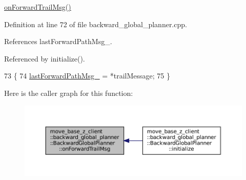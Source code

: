 \hyperlink{classmove__base__z__client_1_1backward__global__planner_1_1BackwardGlobalPlanner_a21ba5e6dbe063eb3ea1a34d8cccf90a3}{on\+Forward\+Trail\+Msg()} 

Definition at line 72 of file backward\+\_\+global\+\_\+planner.\+cpp.



References last\+Forward\+Path\+Msg\+\_\+.



Referenced by initialize().


\begin{DoxyCode}
73 \{
74     \hyperlink{classmove__base__z__client_1_1backward__global__planner_1_1BackwardGlobalPlanner_a058da13b9ee6b1d878830503e67de638}{lastForwardPathMsg\_} = *trailMessage;
75 \}
\end{DoxyCode}
Here is the caller graph for this function\+:
\nopagebreak
\begin{figure}[H]
\begin{center}
\leavevmode
\includegraphics[width=350pt]{classmove__base__z__client_1_1backward__global__planner_1_1BackwardGlobalPlanner_a21ba5e6dbe063eb3ea1a34d8cccf90a3_icgraph}
\end{center}
\end{figure}
\mbox{\label{classmove__base__z__client_1_1backward__global__planner_1_1BackwardGlobalPlanner_adefb1127aa2a4f9c487763aea3817864}} 
